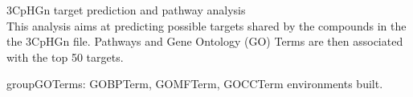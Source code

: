 \documentclass{article}
\begin{document}

\begin{Schunk}
\end{Schunk}

{\huge 3CpHGn target prediction and pathway analysis}\\

This analysis aims at predicting possible targets shared by the compounds in the the 3CpHGn file. Pathways and Gene Ontology (GO) Terms are then associated with the top 50 targets. 

\begin{Schunk}
\begin{Soutput}
groupGOTerms: 	GOBPTerm, GOMFTerm, GOCCTerm environments built.
\end{Soutput}
\end{Schunk}
\end{document}
